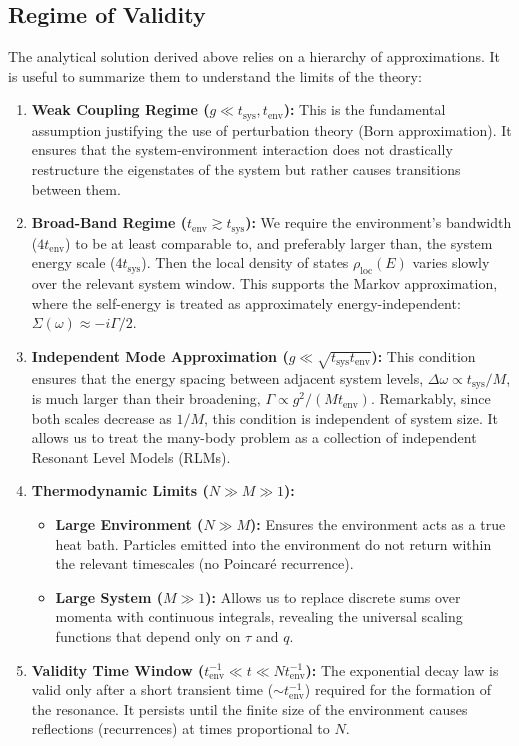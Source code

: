 \documentclass[12pt,oneside,openright]{report}
\theoremstyle{definition}
\theoremstyle{plain}
\theoremstyle{remark}
\begin{document}
\subsection{Regime of Validity}
\label{subsec:validity_conditions}

The analytical solution derived above relies on a hierarchy of approximations. It is useful to summarize them to understand the limits of the theory:

\begin{enumerate}
\item \textbf{Weak Coupling Regime ($g \ll t_{\text{sys}}, t_{\text{env}}$):}
   This is the fundamental assumption justifying the use of perturbation theory (Born approximation). It ensures that the system-environment interaction does not drastically restructure the eigenstates of the system but rather causes transitions between them.

\item \textbf{Broad-Band Regime ($t_{\text{env}} \gtrsim t_{\text{sys}}$):}
   We require the environment's bandwidth ($4t_{\text{env}}$) to be at least comparable to, and preferably larger than, the system energy scale ($4t_{\text{sys}}$). Then the local density of states $\rho_{\mathrm{loc}}(E)$ varies slowly over the relevant system window. This supports the Markov approximation, where the self-energy is treated as approximately energy-independent: $\Sigma(\omega) \approx -i \Gamma/2$.

\item \textbf{Independent Mode Approximation ($g \ll \sqrt{t_{\text{sys}} t_{\text{env}}}$):}
   This condition ensures that the energy spacing between adjacent system levels, $\Delta \omega \propto t_{\text{sys}}/M$, is much larger than their broadening, $\Gamma \propto g^2/(M t_{\text{env}})$. Remarkably, since both scales decrease as $1/M$, this condition is independent of system size. It allows us to treat the many-body problem as a collection of independent Resonant Level Models (RLMs).

\item \textbf{Thermodynamic Limits ($N \gg M \gg 1$):}
   \begin{itemize}
       \item \textbf{Large Environment ($N \gg M$):} Ensures the environment acts as a true heat bath. Particles emitted into the environment do not return within the relevant timescales (no Poincaré recurrence).
       \item \textbf{Large System ($M \gg 1$):} Allows us to replace discrete sums over momenta with continuous integrals, revealing the universal scaling functions that depend only on $\tau$ and $q$.
   \end{itemize}

\item \textbf{Validity Time Window ($t_{\text{env}}^{-1} \ll t \ll N t_{\text{env}}^{-1}$):}
   The exponential decay law is valid only after a short transient time ($\sim t_{\text{env}}^{-1}$) required for the formation of the resonance. It persists until the finite size of the environment causes reflections (recurrences) at times proportional to $N$.
\end{enumerate}
\end{document}
